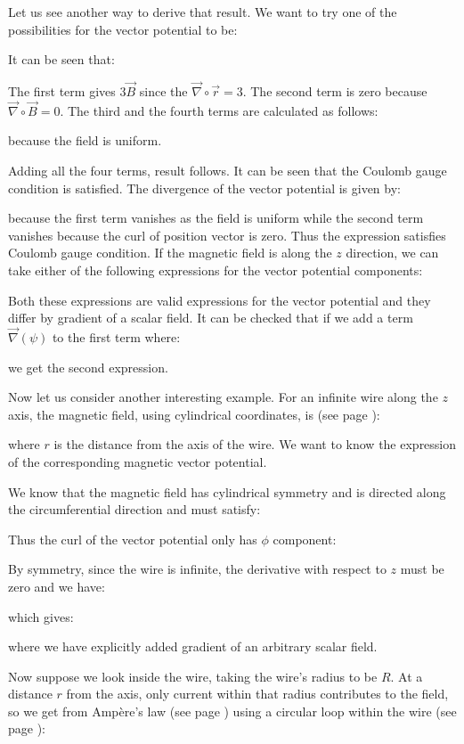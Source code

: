 	Let us see another way to derive that result. We want to try one of the possibilities for the vector potential to be:
	
	It can be seen that:
	
	The first term gives $3 \vec{B}$ since the $\vec \nabla \circ \vec{r}=3$. The second term is zero because $\vec{\nabla}\circ \vec{B}=0$. The third and the fourth terms are calculated as follows:
	
	because the field is uniform.
	

	Adding all the four terms, result follows. It can be seen that the Coulomb gauge condition is satisfied. The divergence of the vector potential is given by:
	
	because the first term vanishes as the field is uniform while the second term vanishes because the curl of position vector is zero. Thus the expression satisfies Coulomb gauge condition. If the magnetic field is along the $z$ direction, we can take either of the following expressions for the vector potential components:
	
	Both these expressions are valid expressions for the vector potential and they differ by gradient of a scalar field. It can be checked that if we add a term $\vec\nabla (\psi)$ to the first term where:
	
	we get the second expression.
	
	Now let us consider another interesting example. For an infinite wire along the $z$ axis, the magnetic field, using cylindrical coordinates, is (see page \pageref{magnetic field for an infinite wire}):
	
	where $r$ is the distance from the axis of the wire. We want to know the expression of the corresponding magnetic vector potential.
	
	We know that the magnetic field has cylindrical symmetry and is directed along the circumferential direction and must satisfy:
	
	Thus the curl of the vector potential only has $\phi$ component:
	
	By symmetry, since the wire is infinite, the derivative with respect to $z$ must be zero and we have:
	
	which gives:
	
	where we have explicitly added gradient of an arbitrary scalar field.

	Now suppose we look inside the wire, taking the wire's radius to be $R$. At a distance $r$ from the axis, only current within that radius contributes to the field, so we get from Ampère's law (see page \pageref{Ampère's law}) using a circular loop within the wire (see page \pageref{magnetic field for an infinite wire}):
	
